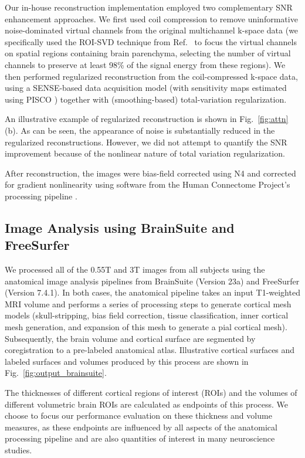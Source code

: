 \documentclass[12pt,letterpaper,onecolumn]{article}
\begin{document}
 
Our in-house reconstruction implementation employed two complementary SNR enhancement approaches.  We first used coil compression to remove uninformative noise-dominated virtual channels from the original multichannel k-space data \cite{buehrer2007,huang2008,kim2021} (we specifically used the ROI-SVD technique from Ref.~ to focus the virtual channels on spatial regions containing brain parenchyma, selecting the number of virtual channels to preserve at least 98\% of the signal energy from these regions).  We then performed regularized reconstruction from the coil-compressed k-space data, using a SENSE-based data acquisition model\cite{pruessmann2001} (with sensitivity maps estimated using PISCO \cite{lobos2023}) together with (smoothing-based) total-variation regularization\cite{block2007}.  

An illustrative example of regularized reconstruction is shown in Fig.~\ref{fig:attn}(b).   As can be seen, the appearance of noise is substantially reduced in the regularized reconstructions. However, we did not attempt to quantify the SNR improvement because of the nonlinear nature of total variation regularization.  

After reconstruction, the images were bias-field corrected using N4 \cite{tustison2010} and corrected for gradient nonlinearity using software from the Human Connectome Project's processing pipeline \cite{glasser2013minimal}.

\subsection{Image Analysis using BrainSuite and FreeSurfer}
We processed all of the 0.55T and 3T images from all subjects using the anatomical image analysis pipelines from BrainSuite \cite{shattuck2002brainsuite} (Version 23a) and  FreeSurfer \cite{fischl2012freesurfer} (Version 7.4.1).  In both cases, the anatomical pipeline takes an input T1-weighted MRI volume and performs a series of processing steps to generate cortical mesh models (skull-stripping, bias field correction, tissue classification, inner cortical mesh generation, and expansion of this mesh to generate a pial cortical mesh).  Subsequently, the brain volume and cortical surface are segmented by coregistration to a pre-labeled anatomical atlas.  Illustrative cortical surfaces and labeled surfaces and volumes produced by this process are shown in Fig.~\ref{fig:output_brainsuite}.

The thicknesses of different cortical regions of interest (ROIs) and the volumes of different volumetric brain ROIs are calculated as endpoints of this process.  We choose to focus our performance evaluation on these thickness and volume measures, as these endpoints are influenced by all aspects of the anatomical processing pipeline and are also quantities of interest in many neuroscience studies.
\end{document}
